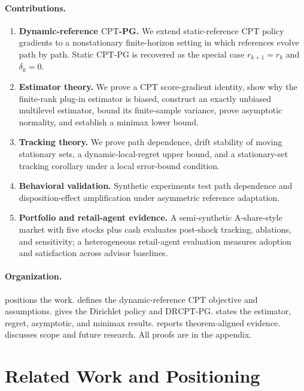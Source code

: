 \documentclass[11pt]{article}
\newcommand{\1}{\mathbf 1}
\newcommand{\CPT}{\ensuremath{\mathrm{CPT}}\xspace}
\newcommand{\CPTPG}{\ensuremath{\mathrm{CPT\mbox{-}PG}}\xspace}
\newcommand{\DRCPTPG}{\ensuremath{\mathrm{DRCPT\mbox{-}PG}}\xspace}
\begin{document}
\paragraph{Contributions.}
\begin{enumerate}[leftmargin=2em]
\item \textbf{Dynamic-reference \CPT-PG.}  We extend static-reference \CPT policy gradients to a nonstationary finite-horizon setting in which references evolve path by path.  Static \CPTPG is recovered as the special case $r_{k+1}=r_k$ and $\delta_k=0$.
\item \textbf{Estimator theory.}  We prove a \CPT score-gradient identity, show why the finite-rank plug-in estimator is biased, construct an exactly unbiased multilevel estimator, bound its finite-sample variance, prove asymptotic normality, and establish a minimax lower bound.
\item \textbf{Tracking theory.}  We prove path dependence, drift stability of moving stationary sets, a dynamic-local-regret upper bound, and a stationary-set tracking corollary under a local error-bound condition.
\item \textbf{Behavioral validation.}  Synthetic experiments test path dependence and disposition-effect amplification under asymmetric reference adaptation.
\item \textbf{Portfolio and retail-agent evidence.}  A semi-synthetic A-share-style market with five stocks plus cash evaluates post-shock tracking, ablations, and sensitivity; a heterogeneous retail-agent evaluation measures adoption and satisfaction across advisor baselines.
\end{enumerate}

\paragraph{Organization.}
 positions the work.   defines the dynamic-reference \CPT objective and assumptions.   gives the Dirichlet policy and \DRCPTPG.   states the estimator, regret, asymptotic, and minimax results.   reports theorem-aligned evidence.   discusses scope and future research.  All proofs are in the appendix.

\section{Related Work and Positioning}\label{sec:related}
\end{document}
